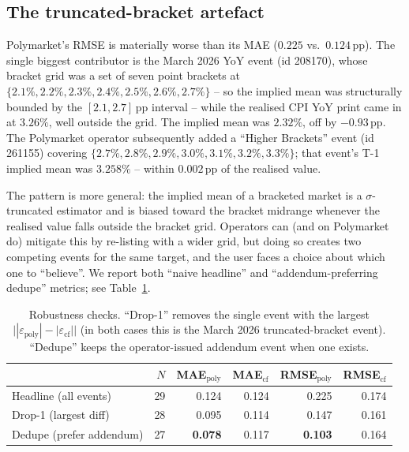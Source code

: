 \documentclass{article}
\begin{document}
\subsection{The truncated-bracket artefact}

Polymarket's RMSE is materially worse than its MAE
($0.225$ vs.\ $0.124$\,pp).  The single biggest contributor is the
March 2026 YoY event (id 208170), whose bracket grid was a set of
seven point brackets at $\{2.1\%, 2.2\%, 2.3\%, 2.4\%, 2.5\%, 2.6\%,
2.7\%\}$ -- so the implied mean was structurally bounded by the
$[2.1, 2.7]$\,pp interval -- while the realised CPI YoY print came
in at $3.26\%$, well outside the grid.  The implied mean was $2.32\%$,
off by $-0.93$\,pp.  The Polymarket operator subsequently added a
``Higher Brackets'' event (id 261155) covering
$\{2.7\%, 2.8\%, 2.9\%, 3.0\%, 3.1\%, 3.2\%, 3.3\%\}$; that event's
T-1 implied mean was $3.258\%$ -- within $0.002$\,pp of the realised
value.

The pattern is more general: the implied mean of a bracketed market
is a $\sigma$-truncated estimator and is biased toward the bracket
midrange whenever the realised value falls outside the bracket grid.
Operators can (and on Polymarket do) mitigate this by re-listing with
a wider grid, but doing so creates two competing events for the same
target, and the user faces a choice about which one to ``believe''.
We report both ``naive headline'' and ``addendum-preferring dedupe''
metrics; see Table~\ref{tab:robustness}.

\begin{table}[t]
\centering
\caption{Robustness checks.  ``Drop-1'' removes the single event with
the largest $\big||\varepsilon_{\text{poly}}| - |\varepsilon_{\text{cf}}|\big|$
(in both cases this is the March 2026 truncated-bracket event).
``Dedupe'' keeps the operator-issued addendum event when one exists.}
\label{tab:robustness}
\begin{tabular}{lrrrrr}
\toprule
                       & $N$ & MAE$_{\text{poly}}$ & MAE$_{\text{cf}}$ & RMSE$_{\text{poly}}$ & RMSE$_{\text{cf}}$ \\
\midrule
Headline (all events)  & 29 & 0.124 & 0.124 & 0.225 & 0.174 \\
Drop-1 (largest diff)  & 28 & 0.095 & 0.114 & 0.147 & 0.161 \\
Dedupe (prefer addendum) & 27 & \textbf{0.078} & 0.117 & \textbf{0.103} & 0.164 \\
\bottomrule
\end{tabular}
\end{table}
\end{document}
